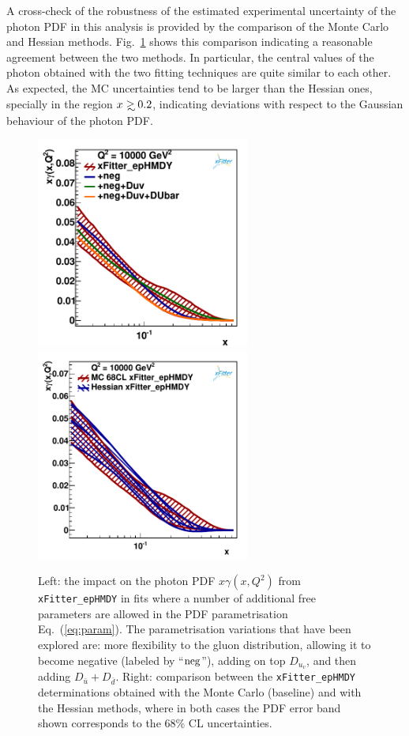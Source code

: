 A cross-check of the robustness of the estimated
experimental uncertainty of the photon PDF in this analysis is provided by the
comparison of the Monte Carlo and Hessian methods.
%
Fig.~\ref{fig:photon_mc_vs_hessian} shows this comparison
indicating a reasonable agreement between the two methods.
%
In particular, the central values of the photon obtained with the two
fitting techniques are quite similar to each other.
%
As expected, the MC uncertainties tend to be larger than the Hessian ones,
specially in the region $x\gsim 0.2$, indicating deviations with respect
to the Gaussian behaviour of the photon PDF.

\begin{figure}[t]
\centering
\includegraphics[width=7cm]{figs/q2_10000_pdf_ph_param_var.pdf}
\includegraphics[width=7cm]{figs/photon_mc_vs_hessian.pdf} 
\caption{Left: the impact on the photon PDF $x\gamma(x,Q^2)$
  from {\tt xFitter\_epHMDY}
  in fits where a number of additional free parameters are allowed
  in the PDF parametrisation Eq.~(\ref{eq:param}).
  The parametrisation variations that have been explored
  are: more flexibility to the gluon distribution, allowing
  it to become negative
  (labeled by ``${\rm neg}$''), adding on top $D_{u_v}$, and then
  adding $D_{\bar{u}}+D_{\bar{d}}$.
 Right: comparison between the {\tt xFitter\_epHMDY} determinations obtained with the
 Monte Carlo (baseline) and with the Hessian methods, where in
  both cases the PDF error band  shown corresponds to the 68\% CL uncertainties.  }
\label{fig:param}
\label{fig:photon_mc_vs_hessian}
\end{figure}

